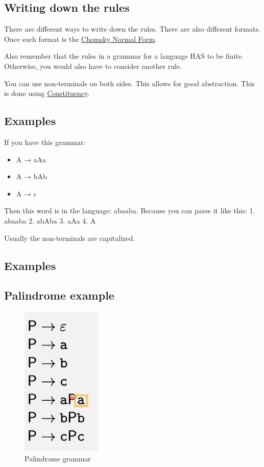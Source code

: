 \documentclass[
  11pt,
  british,
]{article}
\providecommand{\tightlist}{%
  \setlength{\itemsep}{0pt}\setlength{\parskip}{0pt}}
\begin{document}
\hypertarget{writing-down-the-rules}{%
\subsection{Writing down the rules}\label{writing-down-the-rules}}

There are different ways to write down the rules. There are also
different formats. Once such format is the
\href{Chomsky\%20Normal\%20Form.md}{Chomsky Normal Form}.

Also remember that the rules in a grammar for a language HAS to be
finite. Otherwise, you would also have to consider another rule.

You can use non-terminals on both sides. This allows for good
abstraction. This is done using \href{Constituency.md}{Constituency}.

\hypertarget{examples-1}{%
\subsection{Examples}\label{examples-1}}

If you have this grammar:

\begin{itemize}
\tightlist
\item
  A → aAa
\item
  A → bAb
\item
  A → \(\epsilon\)
\end{itemize}

Then this word is in the language: abaaba. Because you can parse it like
this: 1. abaaba 2. abAba 3. aAa 4. A

Usually the non-terminals are capitalized.

\hypertarget{examples-2}{%
\subsection{Examples}\label{examples-2}}

\hypertarget{palindrome-example}{%
\subsection{Palindrome example}\label{palindrome-example}}

\begin{figure}
\centering
\includegraphics{Pasted_image_20211127131012.png}
\caption{Palindrome grammar}
\end{figure}
\end{document}
